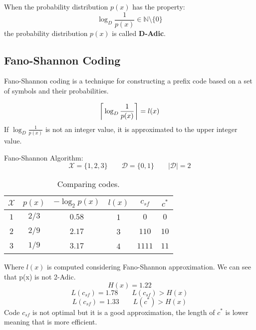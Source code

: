 When the probability distribution $p(x)$ has the property:
$$ \log_D \frac{1}{p(x)} \in \mathbb{N}\setminus\{0\}$$
the probability distribution $p(x)$ is called \textbf{D-Adic}.

\subsection{Fano-Shannon Coding}
Fano-Shannon coding is a technique for constructing a prefix code based on a set of symbols and their probabilities.

$$\ceil[\bigg]{\log_D \frac{1}{p(x)}} = l(x)$$
If $\log_D \frac{1}{p(x)}$ is not an integer value, it is approximated to the upper integer value.

\begin{exmp} Fano-Shannon Algorithm:
	$$\mathcal{X} = \{1, 2, 3\} \qquad \mathcal{D} = \{0,1\} \qquad |\mathcal{D}| = 2$$
	
	\begin{table}[H]
		\centering
		\begin{tabular}{| c | c | c | c | c | c |}
			\hline
			$\mathcal{X}$ & $p(x)$ & $-\log_2p(x)$ & $l(x)$ & $c_{sf}$ & $c^*$ \\\hline
			$1$ & $2/3$ & $0.58$& 1 & $0$& $0$\\
			$2$ & $2/9$ & $2.17$& 3 & $110$& $10$\\
			$3$ & $1/9$ & $3.17$& 4 & $1111$& $11$\\
			\hline
		\end{tabular}
		\caption{Comparing codes.}
	\end{table}
\end{exmp}
Where $l(x)$ is computed considering Fano-Shannon approximation. We can see that p(x) is not 2-Adic.
$$ H(x) = 1.22$$
$$ L(c_{sf}) = 1.78 \qquad L(c_{sf}) >  H(x)$$
$$ L(c_{sf}) = 1.33 \qquad L(c^*) >  H(x)$$
Code $c_{sf}$ is not optimal but it is a good approximation, the length of $c^*$ is lower meaning that is more efficient.


